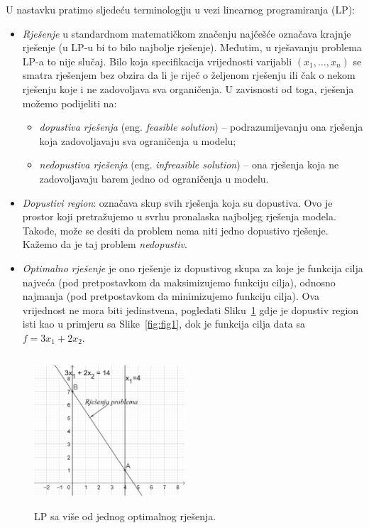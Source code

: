 \documentclass[a4paper, utf8, 11pt, colorlinks]{book}
\begin{document}
 U nastavku pratimo sljedeću terminologiju u vezi linearnog programiranja (LP):
\begin{itemize}
    \item \emph{Rješenje} u standardnom matematičkom značenju najčešće označava krajnje rješenje   (u LP-u bi to bilo najbolje rješenje). Međutim, u rješavanju problema LP-a to  nije slučaj. Bilo koja specifikacija vrijednosti varijabli  $(x_1,\ldots, x_n)$ se smatra rješenjem bez obzira da li je riječ o željenom rješenju ili čak o nekom rješenju koje i ne zadovoljava sva organičenja. U zavisnosti od toga, rješenja  možemo podijeliti na:
    \begin{itemize}
        \item \emph{dopustiva rješenja} (eng. \emph{feasible solution}) -- podrazumijevanju ona rješenja koja zadovoljavaju sva ograničenja u modelu;
        \item \emph{nedopustiva rješenja} (eng. \emph{infreasible solution}) -- ona rješenja koja ne zadovoljavaju barem jedno od ograničenja u modelu. 
    \end{itemize}
  \item \emph{Dopustivi region}: označava skup svih rješenja koja su dopustiva. Ovo je prostor koji pretražujemo u svrhu pronalaska najboljeg rješenja modela. Takođe, može se desiti da problem nema niti jedno dopustivo rješenje. Kažemo da je taj problem \emph{nedopustiv}. 
  \item \emph{Optimalno rješenje} je ono rješenje iz dopustivog skupa za koje je funkcija cilja najveća (pod pretpostavkom da maksimizujemo funkciju cilja), odnosno najmanja (pod pretpostavkom da minimizujemo funkciju cilja). Ova vrijednost ne mora biti jedinstvena, pogledati Sliku~\ref{fig:multi_solution} gdje je dopustiv region isti kao u primjeru sa Slike~\ref{fig:fig1}, dok je funkcija cilja data sa $f = 3x_1 + 2 x_2$.  
 \end{itemize}
 
 \begin{figure}
     \centering
     \includegraphics[width=160pt, height=160pt]{fig3.eps}
     \caption{LP sa više od jednog optimalnog rješenja.}
     \label{fig:multi_solution}
 \end{figure}
 
\end{document}
